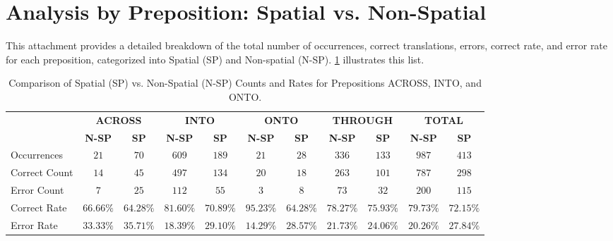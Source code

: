 

%

\section*{Analysis by Preposition: Spatial vs. Non-Spatial}
\label{att1}

This attachment provides a detailed breakdown of the total number of occurrences, correct translations, errors, correct rate, and error rate for each preposition, categorized into Spatial (SP) and Non-spatial (N-SP). \ref{tab:analysis} illustrates this list.

\begin{landscape}

\begin{table}[h!]
\centering
\begin{adjustbox}{max width=\linewidth}
\begin{tabular}{lcccccccccc}
\toprule
 & \multicolumn{2}{c}{\textbf{ACROSS}} & \multicolumn{2}{c}{\textbf{INTO}} & \multicolumn{2}{c}{\textbf{ONTO}} & \multicolumn{2}{c}{\textbf{THROUGH}} & \multicolumn{2}{c}{\textbf{TOTAL}} \\ 
 & \textbf{N-SP} & \textbf{SP} & \textbf{N-SP} & \textbf{SP} & \textbf{N-SP} & \textbf{SP} & \textbf{N-SP} & \textbf{SP} & \textbf{N-SP} & \textbf{SP} \\ 
\midrule
Occurrences & $21$ & $70$ & $609$ & $189$ & $21$ & $28$ & $336$ & $133$ & $987$ & $413$ \\ 
Correct Count & $14$ & $45$ & $497$ & $134$ & $20$ & $18$ & $263$ & $101$ & $787$ & $298$ \\ 
Error Count & $7$ & $25$ & $112$ & $55$ & $3$ & $8$ & $73$ & $32$ & $200$ & $115$ \\ 
\midrule
Correct Rate & $66.66\%$ & $64.28\%$ & $81.60\%$ & $70.89\%$ & $95.23\%$ & $64.28\%$ & $78.27\%$ & $75.93\%$ & $79.73\%$ & $72.15\%$ \\ 
\midrule
Error Rate & $33.33\%$ & $35.71\%$ & $18.39\%$ & $29.10\%$ & $14.29\%$ & $28.57\%$ & $21.73\%$ & $24.06\%$ & $20.26\%$ & \textbf{$27.84\%$} \\ 
\bottomrule
\end{tabular}
\end{adjustbox}
\caption{Comparison of Spatial (SP) vs. Non-Spatial (N-SP) Counts and Rates for Prepositions ACROSS, INTO, and ONTO.}
\label{tab:analysis}
\end{table}

\end{landscape}


